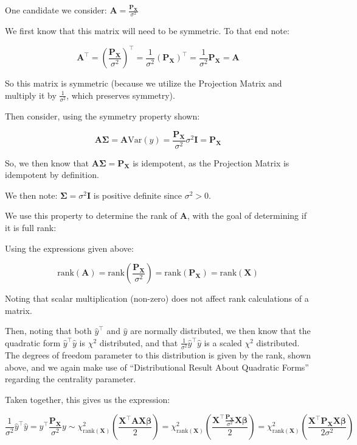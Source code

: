 \documentclass[
]{article}
\begin{document}
One candidate we consider:
\(\boldsymbol{A} = \frac{\boldsymbol{P_X}}{\sigma^2}\)

We first know that this matrix will need to be symmetric. To that end
note:

\[
\boldsymbol{A}^{\top} = \left( \frac{\boldsymbol{P_X}}{\sigma^2} \right) ^ {\top} = \frac{1}{\sigma^2} \left(\boldsymbol{P_X} \right)^{\top} = \frac{1}{\sigma^2} \boldsymbol{P_X} = \boldsymbol{A}
\]

So this matrix is symmetric (because we utilize the Projection Matrix
and multiply it by \(\frac{1}{\sigma^2}\), which preserves symmetry).

Then consider, using the symmetry property shown:

\[
\boldsymbol{A} \boldsymbol{\Sigma} = \boldsymbol{A} \text{Var}(y) = \frac{\boldsymbol{P_X}}{\sigma^2} \sigma^2 \boldsymbol{I} = \boldsymbol{P_X}
\]

So, we then know that
\(\boldsymbol{A}\boldsymbol{\Sigma}  = \boldsymbol{P_X}\) is idempotent,
as the Projection Matrix is idempotent by definition.

We then note: \(\boldsymbol{\Sigma} = \sigma^2 \boldsymbol{I}\) is
positive definite since \(\sigma^2 > 0\).

We use this property to determine the rank of \(\boldsymbol{A}\), with
the goal of determining if it is full rank:

Using the expressions given above:

\[
\text{rank}(\boldsymbol{A}) = \text{rank}(\frac{\boldsymbol{P_X}}{\sigma^2}) = \text{rank}(\boldsymbol{P_X}) = \text{rank}(\boldsymbol{X})
\]

Noting that scalar multiplication (non-zero) does not affect rank
calculations of a matrix.

Then, noting that both \(\hat{y}^{\top}\) and \(\hat{y}\) are normally
distributed, we then know that the quadratic form
\(\hat{y}^{\top} \hat{y}\) is \(\chi^2\) distributed, and that
\(\frac{1}{\sigma^2} \hat{y}^{\top} \hat{y}\) is a scaled \(\chi^2\)
distributed. The degrees of freedom parameter to this distribution is
given by the rank, shown above, and we again make use of
``Distributional Result About Quadratic Forms'' regarding the centrality
parameter.

Taken together, this gives us the expression:

\[
\frac{1}{\sigma^2} \hat{y}^{\top} \hat{y} = y^{\top} \frac{\boldsymbol{P_X}}{\sigma^2} y \sim \chi^2_{\text{rank}(\boldsymbol{X})} \left( \frac{\boldsymbol{X}^{\top} \boldsymbol{A} \boldsymbol{X} \boldsymbol{\beta}}{2} \right)
= \chi^2_{\text{rank}(\boldsymbol{X})} \left( \frac{\boldsymbol{X}^{\top} \frac{\boldsymbol{P_X}}{\sigma^2} \boldsymbol{X} \boldsymbol{\beta}}{2} \right)
= 
\chi^2_{\text{rank}(\boldsymbol{X})} \left( \frac{\boldsymbol{X}^{\top} \boldsymbol{P_X} \boldsymbol{X} \boldsymbol{\beta}}{2 \sigma^2} \right)
\]
\end{document}
